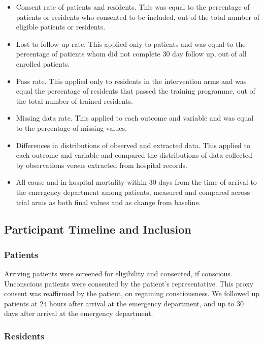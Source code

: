 \documentclass[
]{article}
\providecommand{\tightlist}{%
  \setlength{\itemsep}{0pt}\setlength{\parskip}{0pt}}
\begin{document}
\begin{itemize}
\tightlist
\item
  Consent rate of patients and residents. This was equal to the percentage of patients or residents who consented to be included, out of the total number of eligible patients or residents.
\item
  Lost to follow up rate. This applied only to patients and was equal to the percentage of patients whom did not complete 30 day follow up, out of all enrolled patients.
\item
  Pass rate. This applied only to residents in the intervention arms and was equal the percentage of residents that passed the training programme, out of the total number of trained residents.
\item
  Missing data rate. This applied to each outcome and variable and was equal to the percentage of missing values.
\item
  Differences in distributions of observed and extracted data. This applied to each outcome and variable and compared the distributions of data collected by observations versus extracted from hospital records.
\item
  All cause and in-hospital mortality within 30 days from the time of arrival to the emergency department among patients, measured and compared across trial arms as both final values and as change from baseline.
\end{itemize}

\hypertarget{participant-timeline-and-inclusion}{%
\subsection{Participant Timeline and Inclusion}\label{participant-timeline-and-inclusion}}

\hypertarget{patients-1}{%
\subsubsection{Patients}\label{patients-1}}

Arriving patients were screened for eligibility and consented, if conscious. Unconscious patients were consented by the patient's representative. This proxy consent was reaffirmed by the patient, on regaining consciousness. We followed up patients at 24 hours after arrival at the emergency department, and up to 30 days after arrival at the emergency department.

\hypertarget{residents-1}{%
\subsubsection{Residents}\label{residents-1}}
\end{document}
